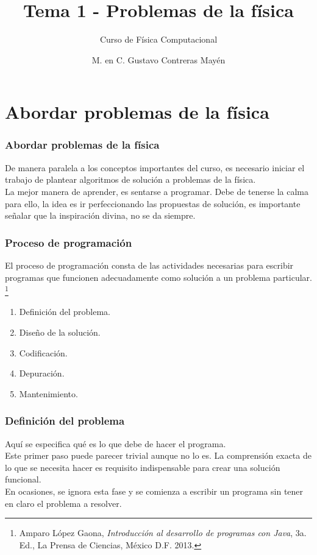 

\title{Tema 1 - Problemas de la f\'{i}sica}
\subtitle{Curso de F\'{i}sica Computacional}
\author[]{M. en C. Gustavo Contreras May\'{e}n}

\maketitle
\fontsize{14}{14}\selectfont
{}
\section{Abordar problemas de la f\'{i}sica}
\begin{frame}
\frametitle{Abordar problemas de la f\'{i}sica}
De manera paralela a los conceptos importantes del curso, es necesario iniciar el trabajo de plantear algoritmos de soluci\'{o}n a problemas de la f\'{i}sica.
\\
\medskip
La mejor manera de aprender, es sentarse a programar. Debe de tenerse la calma para ello, la idea es ir perfeccionando las propuestas de soluci\'{o}n, es importante señalar que la inspiraci\'{o}n divina, no se da siempre.
\end{frame}
\begin{frame}[fragile]
\frametitle{Proceso de programaci\'{o}n}
El proceso de programaci\'{o}n consta de las actividades necesarias para escribir programas que funcionen adecuadamente como soluci\'{o}n a un problema particular. \footnote{Amparo L\'{o}pez Gaona, \textit{Introducci\'{o}n al desarrollo de programas con Java}, 3a. Ed., La Prensa de Ciencias, México D.F. 2013.}
\begin{enumerate}[<+->]
\item Definici\'{o}n del problema.
\item Diseño de la soluci\'{o}n.
\item Codificaci\'{o}n.
\item Depuraci\'{o}n.
\item Mantenimiento.
\end{enumerate}
\end{frame}
\begin{frame}
\frametitle{Definici\'{o}n del problema}
Aqu\'{i} se especifica qu\'{e} es lo que debe de hacer el programa.
\\
\bigskip
Este primer paso puede parecer trivial aunque no lo es. La comprensi\'{o}n exacta de lo que se necesita hacer es requisito indispensable para crear una soluci\'{o}n funcional.
\\
\medskip
En ocasiones, se ignora esta fase y se comienza a escribir un programa sin tener en claro el problema a resolver.
\end{frame}
